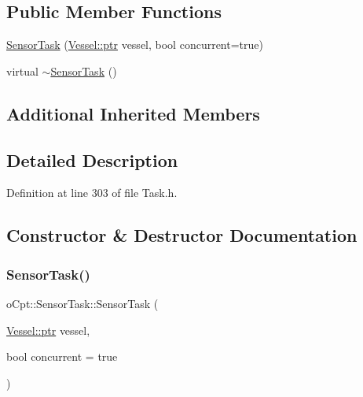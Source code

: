 \subsection*{Public Member Functions}
\begin{DoxyCompactItemize}
\item 
\hyperlink{classo_cpt_1_1_sensor_task_ad309c4f00591c5f583bd7283cbd61418}{Sensor\+Task} (\hyperlink{classo_cpt_1_1i_vessel_a43711a596f3bdfd0ca732ed3901edc97}{Vessel\+::ptr} vessel, bool concurrent=true)
\item 
virtual \hyperlink{classo_cpt_1_1_sensor_task_a10e599626f58306aa05579f2c59a9b8a}{$\sim$\+Sensor\+Task} ()
\end{DoxyCompactItemize}
\subsection*{Additional Inherited Members}


\subsection{Detailed Description}


Definition at line 303 of file Task.\+h.



\subsection{Constructor \& Destructor Documentation}
\hypertarget{classo_cpt_1_1_sensor_task_ad309c4f00591c5f583bd7283cbd61418}{}\label{classo_cpt_1_1_sensor_task_ad309c4f00591c5f583bd7283cbd61418} 
\subsubsection{\texorpdfstring{Sensor\+Task()}{SensorTask()}}
{\footnotesize\ttfamily o\+Cpt\+::\+Sensor\+Task\+::\+Sensor\+Task (\begin{DoxyParamCaption}\item[{\hyperlink{classo_cpt_1_1i_vessel_a43711a596f3bdfd0ca732ed3901edc97}{Vessel\+::ptr}}]{vessel,  }\item[{bool}]{concurrent = {\ttfamily true} }\end{DoxyParamCaption})}



